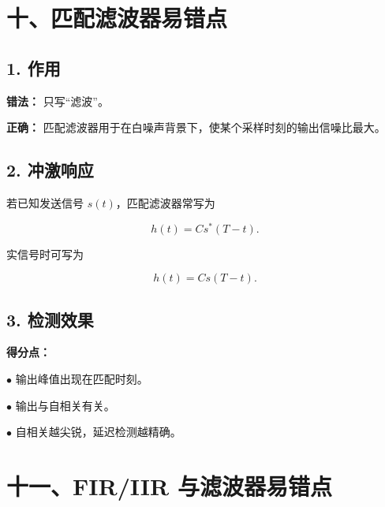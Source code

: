 \documentclass[11pt]{ctexart}
\begin{document}
\section*{十、匹配滤波器易错点}



\subsection*{1. 作用}



\textbf{错法：} 只写“滤波”。\par



\textbf{正确：} 匹配滤波器用于在白噪声背景下，使某个采样时刻的输出信噪比最大。\par



\subsection*{2. 冲激响应}



若已知发送信号 \(s(t)\)，匹配滤波器常写为\par

\[

h(t)=Cs^*(T-t).

\]

实信号时可写为\par

\[

h(t)=Cs(T-t).

\]



\subsection*{3. 检测效果}



\textbf{得分点：}\par



\noindent\(\bullet\) 输出峰值出现在匹配时刻。\par

\noindent\(\bullet\) 输出与自相关有关。\par

\noindent\(\bullet\) 自相关越尖锐，延迟检测越精确。\par



\section*{十一、FIR/IIR 与滤波器易错点}
\end{document}

